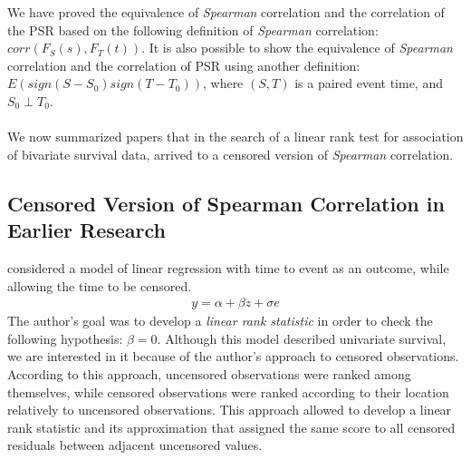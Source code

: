 \documentclass[]{article}
\begin{document}
We have proved the equivalence of \emph{Spearman} correlation and the correlation of the PSR based on the following definition of \emph{Spearman} correlation: $corr(F_S(s), F_T(t))$. It is also possible to show the equivalence of \emph{Spearman} correlation and the correlation of PSR using another definition: $E(sign(S-S_0)sign(T-T_0))$, where $(S,T)$ is a paired event time, and $S_0 \perp T_0$.\\
~\\
We now summarized papers that in the search of a linear rank test for association of bivariate survival data, arrived to a censored version of \emph{Spearman} correlation.


\subsection{Censored Version of Spearman Correlation in Earlier Research}

\cite{prentice1978linear} considered a model of linear regression with time to event as an outcome, while allowing the time to be censored.
	$$
	\begin{aligned}
		y = \alpha + \beta z + \sigma e
	\end{aligned}
	$$
The author's goal was to develop a \emph{linear rank statistic} in order to check the following hypothesis: $\beta = 0$. Although this model described univariate survival, we are interested in it because of the author's approach to censored observations.
According to this approach, uncensored observations were ranked among themselves, while censored observations were ranked according to their location relatively to uncensored observations. This approach allowed to develop a linear rank statistic and its approximation that assigned the same score to all censored residuals between adjacent uncensored values.\\
~\\
\end{document}
